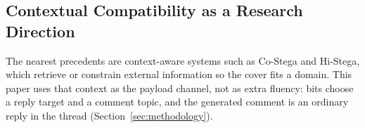 \subsection{Contextual Compatibility as a Research Direction}
\label{sec:related-contextual-compatibility}

The nearest precedents are context-aware systems such as Co-Stega and Hi-Stega, which retrieve or constrain external information so the cover fits a domain.
This paper uses that context as the payload channel, not as extra fluency: bits choose a reply target and a comment topic, and the generated comment is an ordinary reply in the thread (Section~\ref{sec:methodology}).
